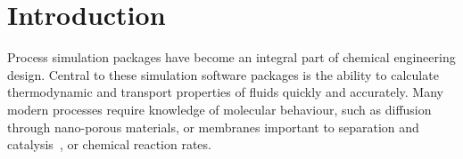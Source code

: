 \documentclass[12pt]{UoAthesis} \usepackage{booktabs}
\begin{document}







\chapter{Introduction}

Process simulation packages have become an integral part of chemical
engineering design. Central to these simulation software packages is
the ability to calculate thermodynamic and transport properties of
fluids quickly and accurately. Many modern processes require knowledge
of molecular behaviour, such as diffusion through nano-porous
materials, or membranes important to separation and
catalysis~\cite{Maginn2010}, or chemical reaction rates.
\end{document}

